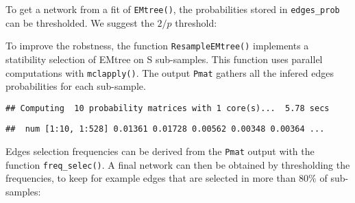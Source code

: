 To get a network from a fit of \texttt{EMtree()}, the probabilities
stored in \texttt{edges\_prob} can be thresholded. We suggest the
$2/p$ threshold:

\begin{Shaded}
\begin{Highlighting}[]
\StringTok{ }\OperatorTok{\$}
\OperatorTok{*}\OperatorTok{>}\OperatorTok{/}
\end{Highlighting}
\end{Shaded}

To improve the robstness, the function \texttt{ResampleEMtree()}
implements a statibility selection of EMtree on S sub-samples. This
function uses parallel computations with \texttt{mclapply()}. The output
\texttt{Pmat} gathers all the infered edges probabilities for each
sub-sample.

\begin{Shaded}
\begin{Highlighting}[]
\NormalTok{(}\OperatorTok{\$}
\NormalTok{, }\NormalTok{,}\NormalTok{, }\NormalTok{)}
\end{Highlighting}
\end{Shaded}

\begin{verbatim}
## Computing  10 probability matrices with 1 core(s)...  5.78 secs
\end{verbatim}

\begin{Shaded}
\begin{Highlighting}[]
\OperatorTok{\$}
\end{Highlighting}
\end{Shaded}

\begin{verbatim}
##  num [1:10, 1:528] 0.01361 0.01728 0.00562 0.00348 0.00364 ...
\end{verbatim}

Edges selection frequencies can be derived from the \texttt{Pmat} output
with the function \texttt{freq\_selec()}. A final network can then be
obtained by thresholding the frequencies, to keep for example edges that
are selected in more than $80\%$ of sub-samples:


